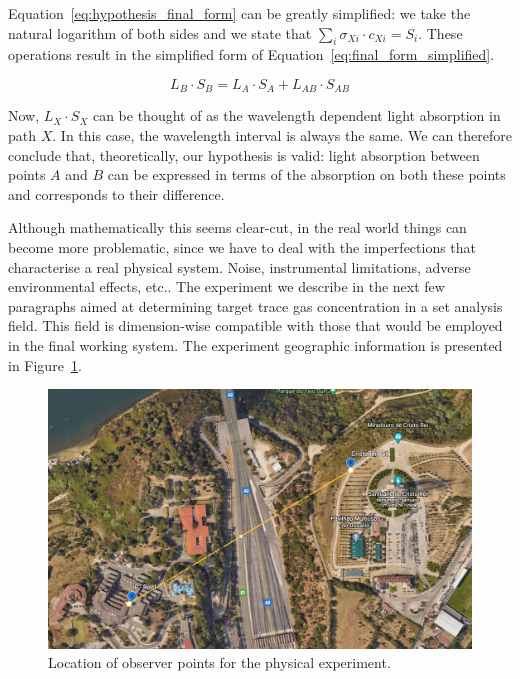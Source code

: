 Equation~\ref{eq:hypothesis_final_form} can be greatly simplified: we
take the natural logarithm of both sides and we state that $\sum_i
\sigma_{Xi} \cdot c_{Xi} = S_i$. These operations result in the
simplified form of Equation~\ref{eq:final_form_simplified}.

\begin{equation}
    \label{eq:final_form_simplified}
    L_B \cdot S_B = L_A \cdot S_A + L_{AB} \cdot S_{AB}
\end{equation}

Now, $L_X \cdot S_X$ can be thought of as the wavelength dependent light
absorption in path $X$. In this case, the wavelength interval is always
the same. We can therefore conclude that, theoretically, our
hypothesis is valid: light absorption between points $A$ and $B$ can be
expressed in terms of the absorption on both these points and
corresponds to their difference.

Although mathematically this seems clear-cut, in the real world things
can become more problematic, since we have to deal with the
imperfections that characterise a real physical system. Noise,
instrumental limitations, adverse environmental effects, etc.. The
experiment we describe in the next few paragraphs aimed at determining
target trace gas concentration in a set analysis field. This field is
dimension-wise compatible with those that would be employed in the final
working system. The experiment geographic information is presented in
Figure~\ref{fig:experiment_map}.

\begin{figure}[htpb]
    \centering
    \includegraphics[width=0.8\linewidth]{img/png/experimentMap.png}
    \caption{Location of observer points for the physical experiment.}
    \label{fig:experiment_map}
\end{figure}
